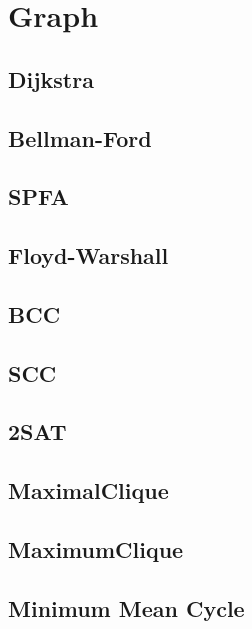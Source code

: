 \section{Graph}

\subsection{Dijkstra}


\subsection{Bellman-Ford}


\subsection{SPFA}


\subsection{Floyd-Warshall}


\subsection{BCC}


\subsection{SCC}


\subsection{2SAT}


\subsection{MaximalClique}


\subsection{MaximumClique}


\subsection{Minimum Mean Cycle}


